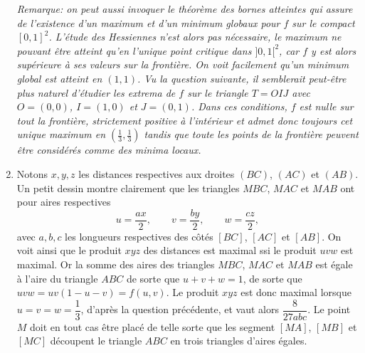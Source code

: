 \begin{enonce}
\begin{solution}
\begin{enumerate}[\bfseries a)]
    {\itshape Remarque: on peut aussi invoquer le théorème des bornes
      atteintes qui assure de l'existence d'un maximum et d'un minimum
      globaux pour $f$ sur le compact $[0,1]^2$. L'étude des
      Hessiennes n'est alors pas nécessaire, le maximum ne pouvant
      être atteint qu'en l'unique point critique dans $]0,1[^2$, car
      $f$ y est alors supérieure à ses valeurs sur la frontière. On
      voit facilement qu'un minimum global est atteint en $(1,1)$. Vu la
      question suivante, il semblerait peut-être
      plus naturel d'étudier les extrema de $f$ sur le triangle $T=OIJ$
      avec $O=(0,0)$, $I=(1,0)$ et $J=(0,1)$. Dans ces conditions, $f$
      est nulle sur tout la frontière, strictement positive à
      l'intérieur et admet donc toujours cet unique maximum en
      $(\frac13,\frac13)$ tandis que toute les points de la frontière
      peuvent être considérés comme des minima locaux.}
  \item Notons $x,y,z$ les distances respectives aux droites $(BC)$,
    $(AC)$ et $(AB)$. Un petit dessin montre clairement que les
    triangles $MBC$, $MAC$ et $MAB$ ont pour aires respectives
    \[u=\dfrac{ax}2,\qquad v=\dfrac{by}{2},\qquad w=\dfrac{cz}2,\]
    avec $a,b,c$ les longueurs respectives des côtés $[BC]$, $[AC]$ et
    $[AB]$. On voit ainsi que le produit $xyz$ des distances est
    maximal ssi le produit $uvw$ est maximal. Or la somme des aires
    des triangles $MBC$, $MAC$ et $MAB$ est égale à l'aire du triangle
    $ABC$ de sorte que $u+v+w=1$, de sorte que
    $uvw=uv(1-u-v)=f(u,v)$. Le produit $xyz$ est donc maximal lorsque
    $u=v=w=\dfrac13$, d'après la question précédente, et vaut alors
    $\dfrac{8}{27abc}$. Le point $M$ doit en tout cas être placé de
    telle sorte que les segment $[MA]$, $[MB]$ et $[MC]$ découpent le
    triangle $ABC$ en trois triangles d'aires égales.
  \end{enumerate}
\end{solution}
\end{enonce}